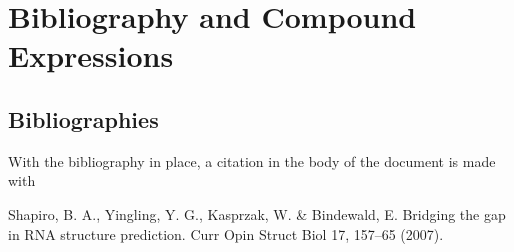 \documentclass{article}
\begin{document}
\section{Bibliography and Compound Expressions}
\subsection{Bibliographies}

With the bibliography in place, a citation in the body of the document is made with \cite{item1}

\begin{thebibliography}{9}
 Shapiro, B. A., Yingling, Y. G., Kasprzak, W. & Bindewald, E. Bridging the gap in RNA structure prediction. Curr Opin Struct Biol 17, 157–65 (2007).
\end{thebibliography}
\end{document}
